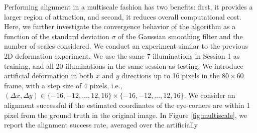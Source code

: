\documentclass[12pt,journal,draftcls,letterpaper,onecolumn]{IEEEtran}
\providecommand{\DIFaddend}{} %
\begin{document}
        \DIFaddend %
Performing alignment in a multiscale fashion has two benefits: first, it provides a larger region of attraction, and second, it reduces overall computational cost. Here, we further investigate the convergence behavior of the algorithm as a function of the standard deviation $\sigma$ of the Gaussian smoothing filter and the number of scales considered.
We conduct an experiment similar to the previous 2D
deformation experiment. We use the same 7 illuminations in
Session 1 as training, and all 20 illuminations in the same
session as testing. We introduce artificial deformation in
both $x$ and $y$ directions up to 16 pixels in the
$80\times 60$ frame, with a step size of 4 pixels, i.e.,
$(\Delta x, \Delta y) \in \{-16,-12,\ldots,12,16\} \times
\{-16,-12,\ldots,12,16\}$. We consider an alignment
successful if the estimated coordinates of the eye-corners
are within 1 pixel from the ground truth in the original
image.  In Figure \ref{fig:multiscale}, we report the
alignment success rate, averaged over the artificially
\end{document}

